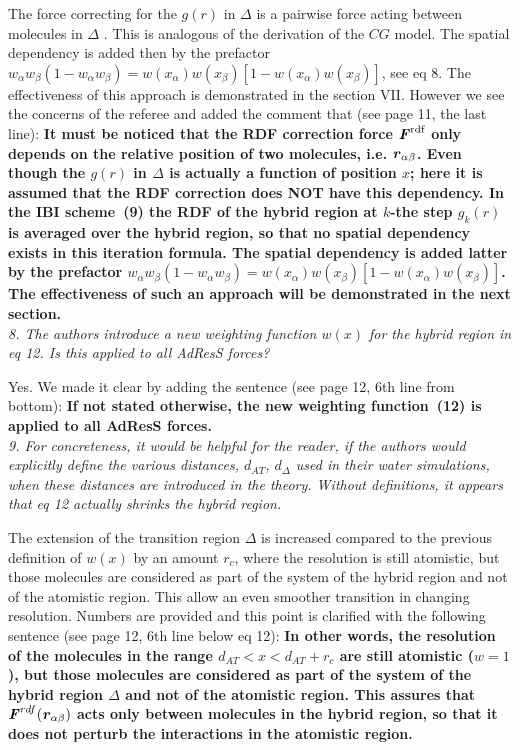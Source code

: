\documentclass[a4paper]{article}
\renewcommand{\v}[1]{\textbf{\textit{#1}}}
\begin{document}
The force correcting for the $g(r)$ in $\Delta$ is a pairwise force acting between molecules in $\Delta$ . This is analogous of the derivation of the $CG$ model. 
The spatial dependency is
added then by the prefactor $ w_\alpha w_\beta (1-w_\alpha w_\beta)
= w(x_\alpha) w(x_\beta) [1-w(x_\alpha) w(x_\beta)]$, see eq 8.
The effectiveness of this approach is demonstrated in the section VII.
However we see the concerns of the referee and added the comment that (see page 11, the last line): {\bf It must be noticed that the RDF correction force $\v F^{\textrm{rdf}}$
  only depends on the
  relative position of two molecules, i.e. $\v r_{\alpha\beta}$.  Even though
  the $g(r)$ in $\Delta$ is actually a function of position $x$; here it is assumed that the RDF correction does NOT have this dependency.
  In the IBI scheme~(9)
  the RDF of the hybrid region at $k$-the step $g_k(r)$ is 
  averaged over the hybrid region, so that no spatial
  dependency exists in this iteration formula.
  The spatial dependency is added latter by the  prefactor
  $ w_\alpha w_\beta (1-w_\alpha w_\beta) = w(x_\alpha) w(x_\beta) [1-w(x_\alpha) w(x_\beta)]$.
  The effectiveness of such an approach will be demonstrated in the next section.}
\\

\textit{
8. The authors introduce a new weighting function $w(x)$ for the hybrid
region in eq 12. Is this applied to all AdResS forces?
}

Yes. We made it clear by adding the sentence (see page 12, 6th line from bottom): {\bf If not stated otherwise, the new weighting function~(12)
  is applied to all AdResS forces.}
\\

\textit{
9. For concreteness, it would be helpful for the reader, if the
authors would explicitly define the various distances, $d_{{AT}}$, $d_{\Delta}$
used in their water simulations, when these distances are introduced
in the theory. Without definitions, it appears that eq 12 actually
shrinks the hybrid region.
}

The extension of the transition region $\Delta$ is increased compared to the previous definition of $w(x)$ by an amount $r_{c}$, where the resolution is still atomistic, but those molecules are considered as part of the system of the hybrid region and not of the atomistic region. This allow an even smoother transition in changing resolution.
Numbers are provided and this point is clarified with the following sentence (see page 12, 6th line below eq 12):
{\bf
In other words, the resolution of the molecules in the range
$d_{AT} < x < d_{{AT}} + r_c$ are still atomistic
($w=1$), but those molecules are considered as part of the system of
the hybrid region $\Delta$ and not of the atomistic region.
This assures that $\v
F^{{rdf}}(\v r_{\alpha\beta})$ acts only between molecules
in the hybrid region, so that it does not perturb the interactions
in the atomistic region.}
\\
\end{document}
